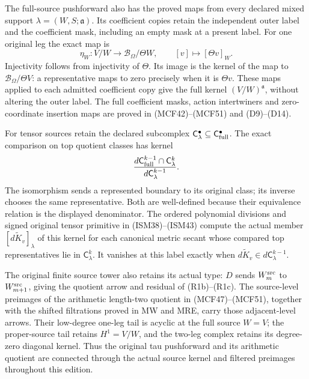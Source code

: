 The full-source pushforward also has the proved maps from every
declared mixed support \(\lambda=(W,S;\mathfrak a)\).
Its coefficient copies retain the independent outer label and
the coefficient mask, including an empty mask at a present label.
For one original leg the exact map is
\[
 \eta_W:V/W\longrightarrow\mathscr B_\Omega/\Theta W,
 \qquad [v]\longmapsto[\Theta v]_W .
\]
Injectivity follows from injectivity of \(\Theta\).  Its image
is the kernel of the map to \(\mathscr B_\Omega/\Theta V\):
a representative maps to zero precisely when it is \(\Theta v\).
These maps applied to each admitted coefficient copy give the
full kernel \((V/W)^{\mathfrak a}\), without altering the outer
label.  The full coefficient masks, action intertwiners and
zero-coordinate insertion maps are proved in (MCF42)--(MCF51)
and (D9)--(D14).

For tensor sources retain the declared subcomplex
\(\mathsf C_\lambda^\bullet\subseteq\mathsf C_{\rm full}^\bullet\).
The exact comparison on top quotient classes has kernel
\[
 \frac{d\mathsf C_{\rm full}^{k-1}\cap\mathsf C_\lambda^k}
      {d\mathsf C_\lambda^{k-1}}.
\]
The isomorphism sends a represented boundary to its original
class; its inverse chooses the same representative.  Both are
well-defined because their equivalence relation is the
displayed denominator.  The ordered polynomial divisions and
signed original tensor primitive in (ISM38)--(ISM43) compute
the actual member \([d\widetilde K_v]_\lambda\) of this kernel
for each canonical metric secant whose compared top
representatives lie in \(\mathsf C_\lambda^k\).
It vanishes at this label exactly when
\(d\widetilde K_v\in d\mathsf C_\lambda^{k-1}\).

The original finite source tower also retains its actual type:
\(D\) sends \(W_m^{\rm src}\) to \(W_{m+1}^{\rm src}\),
giving the quotient arrow and residual of (R1b)--(R1c).
The source-level preimages of the arithmetic length-two
quotient in (MCF47)--(MCF51), together with the shifted
filtrations proved in MW and MRE, carry those adjacent-level
arrows.  Their low-degree one-leg tail is acyclic at the
full source \(W=V\); the proper-source tail retains
\(H^1=V/W\), and the two-leg complex retains its
degree-zero diagonal kernel.  Thus the
original tau pushforward and its arithmetic quotient are
connected through the actual source kernel and filtered
preimages throughout this edition.


